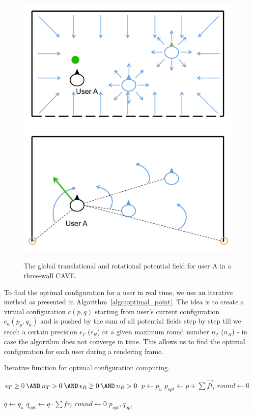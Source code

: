 \begin{figure}[htb]
  \centering
  \includegraphics[width=.49\textwidth]{figures/ch5/pf_t_total}
  \includegraphics[width=.49\textwidth]{figures/ch5/pf_r_total}
  \caption{\label{fig:5_pf_total}The global translational and rotational potential field for user A in a three-wall CAVE.}
\end{figure}


To find the optimal configuration for a user in real time, we use an iterative method as presented in Algorithm~\ref{algo:optimal_point}. The idea is to create a virtual configuration $c(p,q)$ starting from user's current configuration $c_{u}(p_{u},q_{u})$ and is pushed by the sum of all potential fields step by step till we reach a certain precision $\epsilon_{T}$ ($\epsilon_{R}$) or a given maximum round number $n_{T}$ ($n_{R}$) - in case the algorithm does not converge in time. This allows us to find the optimal configuration for each user during a rendering frame.

\begin{algorithm}[htb]
\caption{Iterative function for optimal configuration computing.}
\label{algo:optimal_point}
\begin{algorithmic}
\REQUIRE $\epsilon_{T} \geq 0 \: \AND \: n_{T}>0 \: \AND \: \epsilon_{R} \geq 0 \: \AND \: n_{R}>0$
\STATE $p \leftarrow p_{u}$
\STATE $p_{opt} \leftarrow p+\sum \overrightarrow{ft}_{i}$
\STATE $round \leftarrow 0$
\ENDWHILE

\STATE $q \leftarrow q_{u}$
\STATE $q_{opt} \leftarrow q \cdot \sum fr_{i}$
\STATE $round \leftarrow 0$
\ENDWHILE
\RETURN $p_{opt}, q_{opt}$
\end{algorithmic}
\end{algorithm}


